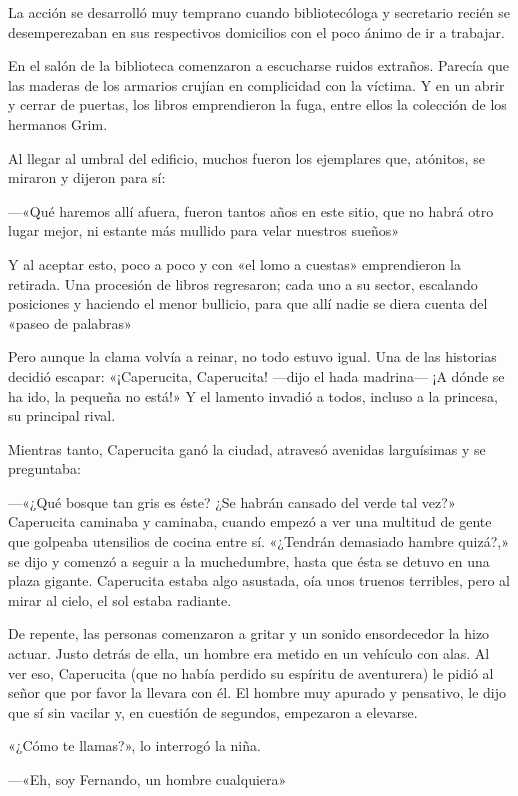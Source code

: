 \documentclass[11pt,twoside,openright,a5paper]{book}
\begin{document}
La acción se desarrolló muy temprano cuando bibliotecóloga y secretario recién se desemperezaban en sus respectivos domicilios con el poco ánimo de ir a trabajar.

En el salón de la biblioteca comenzaron a escucharse ruidos extraños. Parecía que las maderas de los armarios crujían  en complicidad con la víctima. Y en un abrir y cerrar de puertas, los libros emprendieron la fuga, entre ellos la colección de los hermanos Grim.

Al llegar al umbral del edificio, muchos fueron los ejemplares que, atónitos, se miraron y dijeron para sí: 

---«Qué haremos allí afuera, fueron tantos años en este sitio, que no habrá otro lugar mejor, ni estante más mullido para velar nuestros sueños»

Y al aceptar esto, poco a poco y con «el lomo a cuestas» emprendieron la retirada. Una procesión de libros regresaron; cada uno a su sector, escalando posiciones y haciendo el menor bullicio, para que allí nadie se diera cuenta del «paseo de palabras» 

Pero aunque la clama volvía a reinar, no todo estuvo igual. Una de las historias decidió escapar: «¡Caperucita, Caperucita! ---dijo el hada madrina--- ¡A dónde se ha ido, la pequeña no está!» Y el lamento invadió a todos, incluso a la princesa, su principal rival.

Mientras tanto, Caperucita ganó la ciudad, atravesó avenidas larguísimas y se preguntaba:

---«¿Qué bosque tan gris es éste? ¿Se habrán cansado del verde tal vez?» Caperucita caminaba y caminaba, cuando empezó a ver una multitud de gente que golpeaba utensilios de cocina entre sí. «¿Tendrán demasiado hambre quizá?,» se dijo y comenzó a seguir a la muchedumbre, hasta que ésta se detuvo en una plaza gigante. Caperucita estaba algo asustada, oía unos truenos terribles, pero al mirar al cielo, el sol estaba radiante.

De repente, las personas comenzaron a gritar y un sonido ensordecedor la hizo actuar. Justo detrás de ella, un hombre era metido en un vehículo con alas. Al ver eso, Caperucita (que no había perdido su espíritu de aventurera) le pidió al señor que por favor la llevara con él. El hombre muy apurado y pensativo, le dijo que sí sin vacilar y, en cuestión de segundos, empezaron a elevarse.

«¿Cómo te llamas?», lo interrogó la niña.

---«Eh, soy Fernando, un hombre cualquiera»
\end{document}
